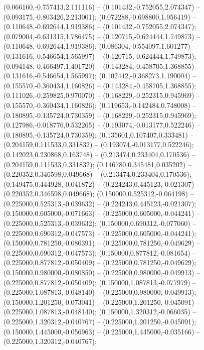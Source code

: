  (0.066160,-0.757413,2.111116) -- (0.101432,-0.752055,2.074347) -- (0.093175,-0.803426,2.213001);
 (0.072288,-0.698800,1.956419) -- (0.110648,-0.692644,1.919386) -- (0.101432,-0.752055,2.074347);
 (0.079004,-0.631315,1.786475) -- (0.120715,-0.624444,1.749873) -- (0.110648,-0.692644,1.919386);
 (0.086304,-0.554097,1.601277) -- (0.131616,-0.546654,1.565997) -- (0.120715,-0.624444,1.749873);
 (0.094148,-0.466497,1.401720) -- (0.143284,-0.458705,1.368855) -- (0.131616,-0.546654,1.565997);
 (0.102442,-0.368273,1.190004) -- (0.155570,-0.360434,1.160826) -- (0.143284,-0.458705,1.368855);
 (0.111026,-0.259825,0.970070) -- (0.168229,-0.252315,0.945969) -- (0.155570,-0.360434,1.160826);
 (0.119653,-0.142484,0.748008) -- (0.180895,-0.135724,0.730359) -- (0.168229,-0.252315,0.945969);
 (0.127986,-0.018776,0.532265) -- (0.193074,-0.013177,0.522246) -- (0.180895,-0.135724,0.730359);
 (0.135601,0.107407,0.333481) -- (0.204159,0.111533,0.331832) -- (0.193074,-0.013177,0.522246);
 (0.142023,0.230868,0.163748) -- (0.213474,0.233404,0.170536) -- (0.204159,0.111533,0.331832);
 (0.146780,0.345481,0.035202) -- (0.220352,0.346598,0.049668) -- (0.213474,0.233404,0.170536);
 (0.149475,0.444928,-0.041872) -- (0.224243,0.445123,-0.021307) -- (0.220352,0.346598,0.049668);
 (0.150000,0.525312,-0.064198) -- (0.225000,0.525313,-0.039632) -- (0.224243,0.445123,-0.021307);
 (0.150000,0.605000,-0.071663) -- (0.225000,0.605000,-0.044241) -- (0.225000,0.525313,-0.039632);
 (0.150000,0.690312,-0.077060) -- (0.225000,0.690312,-0.047573) -- (0.225000,0.605000,-0.044241);
 (0.150000,0.781250,-0.080391) -- (0.225000,0.781250,-0.049629) -- (0.225000,0.690312,-0.047573);
 (0.150000,0.877812,-0.081654) -- (0.225000,0.877812,-0.050409) -- (0.225000,0.781250,-0.049629);
 (0.150000,0.980000,-0.080850) -- (0.225000,0.980000,-0.049913) -- (0.225000,0.877812,-0.050409);
 (0.150000,1.087813,-0.077979) -- (0.225000,1.087813,-0.048140) -- (0.225000,0.980000,-0.049913);
 (0.150000,1.201250,-0.073041) -- (0.225000,1.201250,-0.045091) -- (0.225000,1.087813,-0.048140);
 (0.150000,1.320312,-0.066035) -- (0.225000,1.320312,-0.040767) -- (0.225000,1.201250,-0.045091);
 (0.150000,1.445000,-0.056963) -- (0.225000,1.445000,-0.035166) -- (0.225000,1.320312,-0.040767);
